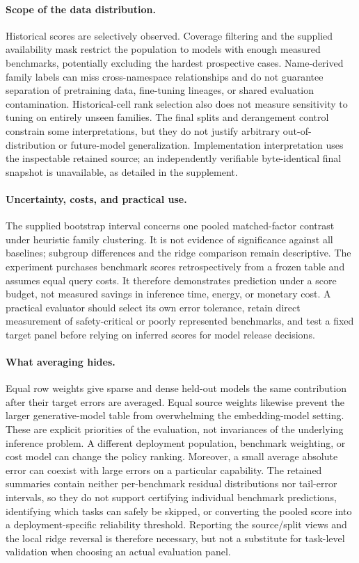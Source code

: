\documentclass{article}
\begin{document}
\paragraph{Scope of the data distribution.}
Historical scores are selectively observed. Coverage filtering and the supplied availability mask restrict the population to models with enough measured benchmarks, potentially excluding the hardest prospective cases. Name-derived family labels can miss cross-namespace relationships and do not guarantee separation of pretraining data, fine-tuning lineages, or shared evaluation contamination. Historical-cell rank selection also does not measure sensitivity to tuning on entirely unseen families. The final splits and derangement control constrain some interpretations, but they do not justify arbitrary out-of-distribution or future-model generalization. Implementation interpretation uses the inspectable retained source; an independently verifiable byte-identical final snapshot is unavailable, as detailed in the supplement.

\paragraph{Uncertainty, costs, and practical use.}
The supplied bootstrap interval concerns one pooled matched-factor contrast under heuristic family clustering. It is not evidence of significance against all baselines; subgroup differences and the ridge comparison remain descriptive. The experiment purchases benchmark scores retrospectively from a frozen table and assumes equal query costs. It therefore demonstrates prediction under a score budget, not measured savings in inference time, energy, or monetary cost. A practical evaluator should select its own error tolerance, retain direct measurement of safety-critical or poorly represented benchmarks, and test a fixed target panel before relying on inferred scores for model release decisions.

\paragraph{What averaging hides.}
Equal row weights give sparse and dense held-out models the same contribution after their target errors are averaged. Equal source weights likewise prevent the larger generative-model table from overwhelming the embedding-model setting. These are explicit priorities of the evaluation, not invariances of the underlying inference problem. A different deployment population, benchmark weighting, or cost model can change the policy ranking. Moreover, a small average absolute error can coexist with large errors on a particular capability. The retained summaries contain neither per-benchmark residual distributions nor tail-error intervals, so they do not support certifying individual benchmark predictions, identifying which tasks can safely be skipped, or converting the pooled score into a deployment-specific reliability threshold. Reporting the source/split views and the local ridge reversal is therefore necessary, but not a substitute for task-level validation when choosing an actual evaluation panel.
\end{document}
